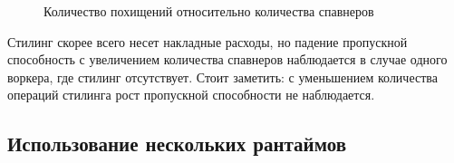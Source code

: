 \begin{figure}[H]
    \begin{center}
    \end{center}

    \caption{Количество похищений относительно количества спавнеров}
    \label{fig:tatlin:metrics:steal_ops}
\end{figure}

Стилинг скорее всего несет накладные расходы, но падение пропускной способность с увеличением количества спавнеров наблюдается в случае одного воркера, где стилинг отсутствует. Стоит заметить: с уменьшением количества операций стилинга рост пропускной способности не наблюдается.

\subsection{Использование нескольких рантаймов}

